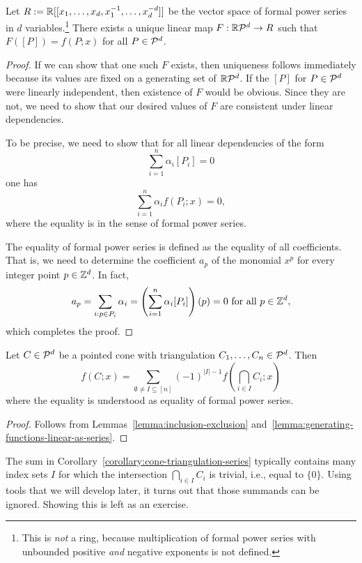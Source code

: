 \begin{lemma}
  \label{lemma:generating-functions-linear-as-series}
  Let $R := \mathbb{R}[[x_1,\ldots,x_d,x_1^{-1},\ldots,x_d^{-d}]]$ be the vector space of formal power series in $d$ variables.\footnote{%
  This is \emph{not} a ring, because multiplication of formal power series with unbounded positive \emph{and} negative exponents is not defined.}
  There exists a unique linear map $F: \mathbb{R} \mathcal{P}^d \to R$
  such that $F([P]) = f(P;x)$ for all $P \in \mathcal{P}^d$.
\end{lemma}
\begin{proof}
  If we can show that one such $F$ exists,
  then uniqueness follows immediately because its values are fixed on a generating set of $\mathbb{R}\mathcal{P}^d$.
  If the $[P]$ for $P \in \mathcal{P}^d$ were linearly independent,
  then existence of $F$ would be obvious.
  Since they are not, we need to show that our desired values of $F$ are consistent under linear dependencies.

  To be precise, we need to show that for all linear dependencies of the form
  \[
    \sum_{i=1}^n \alpha_i [P_i] = 0
  \]
  one has
  \[
    \sum_{i=1}^n \alpha_i f(P_i; x) = 0,
  \]
  where the equality is in the sense of formal power series.

  The equality of formal power series is defined as the equality of all coefficients.
  That is,
  we need to determine the coefficient $a_p$ of the monomial $x^p$
  for every integer point $p \in \mathbb{Z}^d$.
  In fact,
  \[
    a_p = \sum_{i: p \in P_i} \alpha_i = \left(\sum_{i=1}^n \alpha_i [P_i] \right)(p) = 0 \text{ for all } p \in \mathbb{Z}^d,
  \]
  which completes the proof.
\end{proof}

\begin{corollary}
  \label{corollary:cone-triangulation-series}
  Let $C \in \mathcal{P}^d$ be a pointed cone with triangulation $C_1, \ldots, C_n \in \mathcal{P}^d$.
  Then
  \[
    f(C;x) = \sum_{\emptyset \neq I \subseteq [n]} (-1)^{|I| - 1} f(\bigcap_{i \in I} C_i; x)
  \]
  where the equality is understood as equality of formal power series.
\end{corollary}
\begin{proof}
  Follows from Lemmas~\ref{lemma:inclusion-exclusion} and~\ref{lemma:generating-functions-linear-as-series}.
\end{proof}

The sum in Corollary~\ref{corollary:cone-triangulation-series} typically contains
many index sets $I$ for which the intersection $\bigcap_{i \in I} C_i$ is trivial,
i.e., equal to $\{ 0 \}$.
Using tools that we will develop later, it turns out that those summands can be ignored.
Showing this is left as an exercise.

